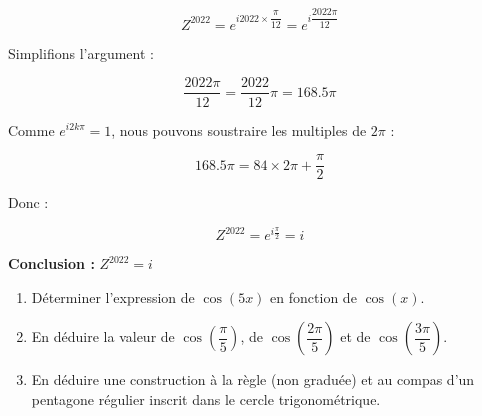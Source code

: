 \documentclass[a4paper,12pt]{article}
\begin{document}
\begin{solutionbox}
\begin{enumerate}
    \[
    Z^{2022} = e^{i 2022 \times \dfrac{\pi}{12}} = e^{i \dfrac{2022\pi}{12}}
    \]
    
    Simplifions l'argument :
    
    \[
    \dfrac{2022\pi}{12} = \dfrac{2022}{12} \pi = 168.5 \pi
    \]
    
    Comme \( e^{i 2k\pi} = 1 \), nous pouvons soustraire les multiples de \( 2\pi \) :
    
    \[
    168.5 \pi = 84 \times 2\pi + \frac{\pi}{2}
    \]
    
    Donc :
    
    \[
    Z^{2022} = e^{i\frac{\pi}{2}} = i
    \]
    
    \textbf{Conclusion :} \( Z^{2022} = i \)
\end{enumerate}
\end{solutionbox}

\begin{tcolorbox}[title={Exercice 16 - [Représenter]}]
\begin{enumerate}
    \item Déterminer l’expression de \( \cos(5x) \) en fonction de \( \cos(x) \).
    \item En déduire la valeur de \( \cos \left( \dfrac{\pi}{5} \right) \), de \( \cos \left( \dfrac{2\pi}{5} \right) \) et de \( \cos \left( \dfrac{3\pi}{5} \right) \).
    \item En déduire une construction à la règle (non graduée) et au compas d’un pentagone régulier inscrit dans le cercle trigonométrique.
\end{enumerate}
\end{tcolorbox}
\end{document}
